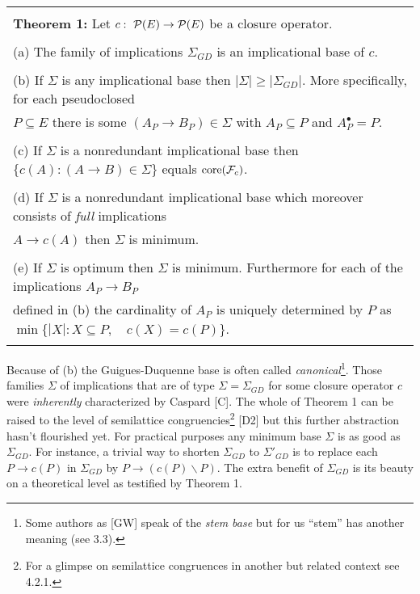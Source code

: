 \documentclass[11pt]{article}
\newcommand{\ra}{\rightarrow}
\begin{document}
\begin{tabular}{|l|} \hline \\
{\bf Theorem 1:} Let $c: \ {\cal P}(E) \ra {\cal P}(E)$ be a closure operator.\\
\\
(a) The family of implications $\Sigma_{GD}$ is an implicational base of $c$.\\
\\
(b) If $\Sigma$ is any implicational base then $|\Sigma| \geq |\Sigma_{GD}|$. More specifically, for each pseudoclosed\\
\hspace*{.5cm} $P \subseteq E$ there is some $(A_P \ra B_P) \in \Sigma$ with $A_P \subseteq P$ and $A^\bullet_P = P$.\\
\\
(c) If $\Sigma$ is a nonredundant implicational base then $\{c(A): (A \ra B) \in \Sigma\}$ equals $\mbox{core} ({\cal F}_c)$.\\
\\
(d) If $\Sigma$ is a nonredundant implicational base which moreover consists of {\it full} implications\\
\hspace*{.5cm} $A \ra c(A)$ then $\Sigma$ is minimum.\\
\\
(e) If $\Sigma$ is optimum then $\Sigma$ is minimum. Furthermore for each of the implications $A_P \ra B_P$\\
\hspace*{.5cm} defined in (b) the cardinality of $A_P$ is uniquely determined by $P$ as\\
\hspace*{.5cm} $\min \{|X|: X \subseteq P, \quad c(X) = c(P)\}.$\\ \\ \hline 
\end{tabular}

Because of (b) the Guigues-Duquenne base is often called {\it canonical}\footnote{Some authors as [GW] speak of the {\it stem base} but for us ``stem'' has another meaning (see 3.3).}. 
Those families $\Sigma$ of implications that are of type $\Sigma = \Sigma_{GD}$ for some closure operator $c$ were {\it inherently} characterized by Caspard [C]. The whole of Theorem 1 can be raised to the level of semilattice congruencies\footnote{For a glimpse on semilattice congruences in another but related context see 4.2.1.} [D2] but this further abstraction hasn't flourished yet. For practical purposes any minimum base $\Sigma$ is as good as $\Sigma_{GD}$.  For instance, a trivial way to shorten $\Sigma_{GD}$ to $\Sigma'_{GD}$ is to replace each $P \ra c(P)$ in $\Sigma_{GD}$ by $P \ra (c(P) \backslash P)$. The extra benefit of $\Sigma_{GD}$ is its beauty on a theoretical level as testified by Theorem 1. 
\end{document}
